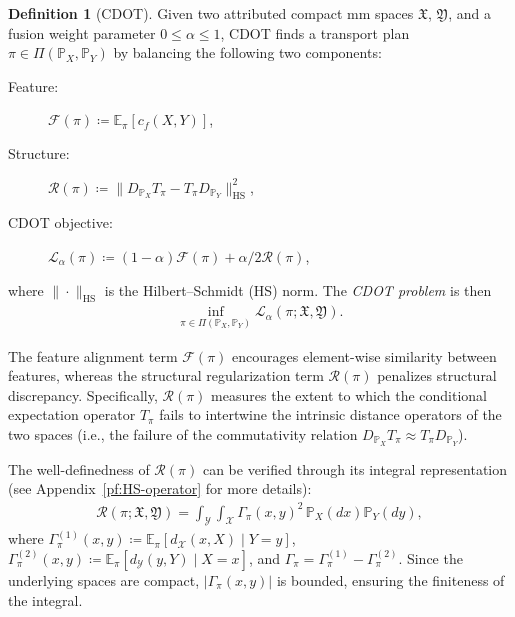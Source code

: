 \documentclass{article}
\theoremstyle{plain}
\theoremstyle{definition}
\newtheorem{definition}[theorem]{Definition}
\theoremstyle{remark}
\begin{document}
\begin{definition}[CDOT]
	\label{def:foot-problem}
	Given two attributed compact mm spaces $\mathfrak{X}$, $\mathfrak{Y}$, and a fusion weight parameter $0 \leq \alpha \leq 1$,
	CDOT finds a transport plan $\pi \in \Pi(\mathbb{P}_X,\mathbb{P}_Y)$ by balancing the following two components:
	\begin{description}
		\item[Feature:]
		$\mathcal{F}(\pi)\coloneqq \mathbb{E}_{\pi}[c_f(X,Y)]$,
		\item[Structure:]
		$\mathcal{R}(\pi) \coloneqq \| D_{\mathbb{P}_X} T_\pi - T_\pi D_{\mathbb{P}_Y} \|_{\mathrm{HS}}^2$,
		\item[CDOT objective:]
		$\mathcal{L}_{\alpha}(\pi) \coloneqq (1-\alpha) \mathcal{F}(\pi) + \alpha/2 \mathcal{R}(\pi)$,
	\end{description}
	where $\|\cdot\|_{\mathrm{HS}}$ is the Hilbert--Schmidt (HS) norm.
	The \emph{CDOT problem} is then
	\begin{align*}
		\inf_{\pi \in \Pi(\mathbb{P}_X,\mathbb{P}_Y)} \mathcal{L}_{\alpha}(\pi; \mathfrak{X},\mathfrak{Y}).
	\end{align*}
\end{definition}

The feature alignment term $\mathcal{F}(\pi)$ encourages element-wise similarity between features, whereas the structural regularization term $\mathcal{R}(\pi)$ penalizes structural discrepancy. Specifically, $\mathcal{R}(\pi)$ measures the extent to which the conditional expectation operator $T_\pi$ fails to intertwine the intrinsic distance operators of the two spaces (i.e., the failure of the commutativity relation $D_{\mathbb{P}_X} T_\pi \approx T_\pi D_{\mathbb{P}_Y}$).

The well-definedness of $\mathcal{R}(\pi)$ can be verified through its integral representation (see Appendix~\ref{pf:HS-operator} for more details):
\begin{align}
	\label{eq:structural-penalty}
	\mathcal{R}(\pi; \mathfrak{X},\mathfrak{Y}) = \int_{\mathcal{Y}}\int_{\mathcal{X}} \Gamma_\pi(x,y)^2 \,\mathbb{P}_X(dx)\mathbb{P}_Y(dy),
\end{align}
where
$\Gamma_\pi^{(1)}(x,y) \coloneqq \mathbb{E}_\pi[d_{\mathcal{X}}(x,X)\mid Y=y]$,
$\Gamma_\pi^{(2)}(x,y) \coloneqq \mathbb{E}_\pi[d_{\mathcal{Y}}(y,Y)\mid X=x]$,
and $\Gamma_\pi=\Gamma_\pi^{(1)}-\Gamma_\pi^{(2)}$. Since the underlying spaces are compact, $|\Gamma_\pi(x,y)|$ is bounded, ensuring the finiteness of the integral.
\end{document}
